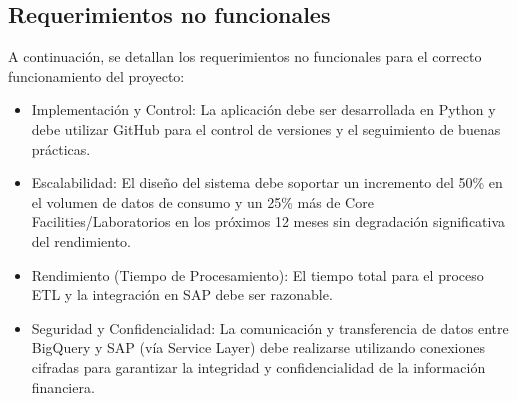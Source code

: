 \subsection{Requerimientos no funcionales}
A continuación, se detallan los requerimientos no funcionales para el correcto funcionamiento del proyecto: 
\begin{itemize}
    \item Implementación y Control: La aplicación debe ser desarrollada en Python y debe utilizar GitHub para el control de versiones y el seguimiento de buenas prácticas.
    \item Escalabilidad: El diseño del sistema debe soportar un incremento del 50\% en el volumen de datos de consumo y un 25\% más de Core Facilities/Laboratorios en los próximos 12 meses sin degradación significativa del rendimiento.
    \item Rendimiento (Tiempo de Procesamiento): El tiempo total para el proceso ETL y la integración en SAP debe ser razonable.
    \item Seguridad y Confidencialidad: La comunicación y transferencia de datos entre BigQuery y SAP (vía Service Layer) debe realizarse utilizando conexiones cifradas para garantizar la integridad y confidencialidad de la información financiera.
\end{itemize}
